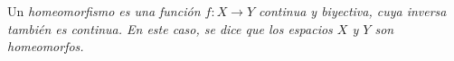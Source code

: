 
\begin{definition}
Un \itshape{homeomorfismo} es una función $f : X \longrightarrow Y$ continua y biyectiva, cuya inversa también es continua. En este caso, se dice que los espacios $X$ y $Y$ son \itshape{homeomorfos}.
\end{definition}
